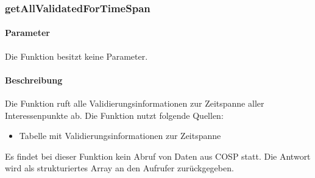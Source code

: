 \subsubsection{getAllValidatedForTimeSpan}
\paragraph{Parameter} Die Funktion besitzt keine Parameter.
\paragraph{Beschreibung} Die Funktion ruft alle Validierungsinformationen zur Zeitspanne aller Interessenpunkte ab. Die Funktion nutzt folgende Quellen:
\begin{itemize}
	\item Tabelle mit Validierungsinformationen zur Zeitspanne
\end{itemize}
Es findet bei dieser Funktion kein Abruf von Daten aus {\glqq COSP\grqq} statt. Die Antwort wird als strukturiertes Array an den Aufrufer zurückgegeben.